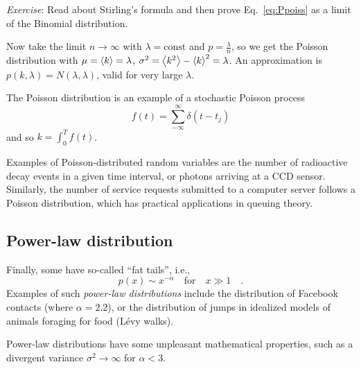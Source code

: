 \documentclass{notebook}
\newcommand{\Exercise}{\textit{Exercise}}
\begin{document}
\Exercise:
Read about Stirling's formula and then prove Eq.~\eqref{eq:Ppoiss} as a limit of the Binomial distribution.


Now take the limit $n \to \infty$ with $\lambda = \mathrm{const}$ and $p = \frac{\lambda}{n}$, so we get the Poisson distribution
%
%
with $\mu = \expval{k} = \lambda$, $\sigma^2 = \expval{k^2} - \expval{k}^2 = \lambda$. An approximation is $p(k,\lambda) = N(\lambda, \lambda)$, valid for very large $\lambda$.

\begin{caveat}
	The Poisson distribution is an example of a stochastic Poisson process 
	\begin{equation}
	f(t) = \sum^{\infty}_{-\infty}{\delta(t - t_j)}
	\end{equation}
	and so $k = \int^T_0{f(t)} $.	
\end{caveat}

Examples of Poisson-distributed random variables are 
the number of radioactive decay events in a given time interval, 
or photons arriving at a CCD sensor. 
Similarly, the number of service requests submitted to a computer server follows a Poisson distribution, 
which has practical applications in queuing theory.

\subsection*{Power-law distribution}
Finally, some have so-called ``fat tails'', i.e.,
\begin{equation}
p(x) \sim x^{- \alpha} \quad \mathrm{for} \quad x \gg 1 \quad.
\end{equation}
Examples of such \textit{power-law distributions} include the distribution of Facebook contacts (where $\alpha = 2.2$), 
or the distribution of jumps in idealized models of animals foraging for food (L\'evy walks).

Power-law distributions have some unpleasant mathematical properties,
such as a divergent variance $\sigma^2 \to \infty $ for $\alpha < 3$.
\end{document}
